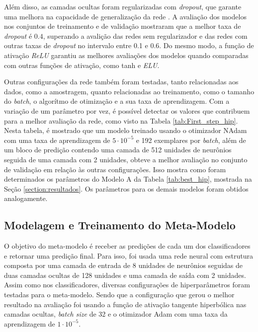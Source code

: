 Além disso, as camadas ocultas foram regularizadas com \emph{dropout}, que garante uma melhora na capacidade de generalização da rede \cite{dropout2}. A avaliação dos modelos nos conjuntos de treinamento e de validação mostraram que a melhor taxa de \emph{dropout} é $0.4$, superando a avalição das redes sem regularizador e das redes com outras taxas de \emph{dropout} no intervalo entre 0.1 e 0.6. Do mesmo modo, a função de ativação \emph{ReLU} garantiu as melhores avaliações dos modelos quando comparadas com outras funções de ativação, como tanh e \emph{ELU}.


Outras configurações da rede também foram testadas, tanto relacionadas aos dados, como a amostragem, quanto relacionadas ao treinamento, como o tamanho do \emph{batch}, o algorítmo de otimização e a sua taxa de aprendizagem. Com a variação de um parâmetro por vez, é possível detectar os valores que contribuem para a melhor avaliação da rede, como visto na Tabela \ref{tab:First_step_hip}. Nesta tabela, é mostrado que um modelo treinado usando o otimizador NAdam com uma taxa de aprendizagem de $5 \cdot 10^{-5}$ e 192 exemplares por \emph{batch}, além de um bloco de predição contendo uma camada de 512 unidades de neurônios seguida de uma camada com 2 unidades, obteve a melhor avaliação no conjunto de validação em relação às outras configurações. Isso mostra como foram determinados os parâmetros do Modelo A da Tabela \ref{tab:best_hip}, mostrada na Seção \ref{section:resultados}. Os parâmetros para os demais modelos foram obtidos analogamente.




\subsection{Modelagem e Treinamento do Meta-Modelo}
\label{section:meta-modelo}

O objetivo do meta-modelo é receber as predições de cada um dos classificadores e retornar uma predição final. Para isso, foi usada uma rede neural com estrutura composta por uma camada de entrada de 8 unidades de neurônios seguidas de duas camadas ocultas de 128 unidades e uma camada de saída com 2 unidades. Assim como nos classificadores, diversas configurações de hiperparâmetros foram testadas para o meta-modelo. Sendo que a configuração que gerou o melhor resultado na avaliação foi usando a função de ativação tangente hiperbólica nas camadas ocultas, \emph{batch size} de 32 e o otimizador Adam com uma taxa da aprendizagem de $1 \cdot 10^{-5}$.

